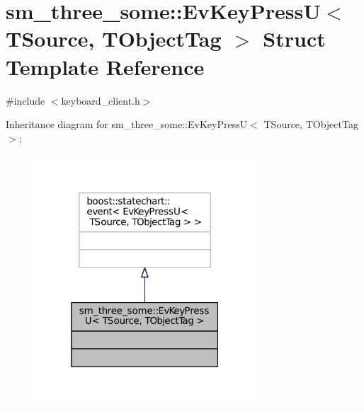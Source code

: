 \hypertarget{structsm__three__some_1_1EvKeyPressU}{}\section{sm\+\_\+three\+\_\+some\+:\+:Ev\+Key\+PressU$<$ T\+Source, T\+Object\+Tag $>$ Struct Template Reference}
\label{structsm__three__some_1_1EvKeyPressU}


{\ttfamily \#include $<$keyboard\+\_\+client.\+h$>$}



Inheritance diagram for sm\+\_\+three\+\_\+some\+:\+:Ev\+Key\+PressU$<$ T\+Source, T\+Object\+Tag $>$\+:
\nopagebreak
\begin{figure}[H]
\begin{center}
\leavevmode
\includegraphics[width=235pt]{structsm__three__some_1_1EvKeyPressU__inherit__graph}
\end{center}
\end{figure}


